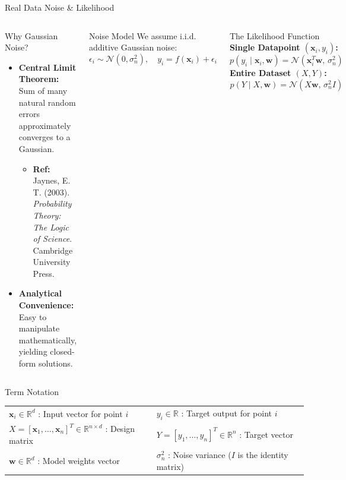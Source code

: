 \documentclass[aspectratio=169, 10pt,handout]{beamer}
\newcommand{\N}{\mathcal{N}}
\newcommand{\bw}{\mathbf{w}}
\newcommand{\bx}{\mathbf{x}}
\begin{document}
\begin{frame}{Real Data Noise \& Likelihood}

  \begin{columns}[T]
      \begin{block}{Why Gaussian Noise?}
        \scriptsize
        \begin{itemize}
          \item \textbf{Central Limit Theorem:} Sum of many natural random errors approximately converges to a Gaussian.
            \begin{itemize}
              \item \tiny \textbf{Ref:} Jaynes, E. T. (2003). \emph{Probability Theory: The Logic of Science}. Cambridge University Press.
            \end{itemize}
          \item \textbf{Analytical Convenience:} Easy to manipulate mathematically, yielding closed-form solutions.
        \end{itemize}
      \end{block}

      
      \begin{block}{Noise Model}
        \scriptsize
        We assume i.i.d. additive Gaussian noise:
        \[
          \epsilon_i \sim \N(0, \sigma_n^2), \quad y_i = f(\bx_i) + \epsilon_i
        \]
      \end{block}
      

      \begin{block}{The Likelihood Function}
        \scriptsize
        \textbf{Single Datapoint $(\bx_i, y_i)$:}
        \[
          p(y_i \mid \bx_i, \bw) = \N(\bx_i^T\bw, \, \sigma_n^2)
        \]
        \textbf{Entire Dataset $(X, Y)$:}
        \[
          p(Y \mid X, \bw) = \N(X\bw, \, \sigma_n^2 I)
        \]
      \end{block}
  \end{columns}

  \vspace{4pt}
  \begin{block}{Term Notation}
    \scriptsize
    \begin{tabular}{ll}
      $\bx_i \in \mathbb{R}^d$ : Input vector for point $i$ & 
      $y_i \in \mathbb{R}$ : Target output for point $i$ \\
      $X = [\bx_1, \dots, \bx_n]^T \in \mathbb{R}^{n \times d}$ : Design matrix & 
      $Y = [y_1, \dots, y_n]^T \in \mathbb{R}^n$ : Target vector \\
      $\bw \in \mathbb{R}^d$ : Model weights vector & 
      $\sigma_n^2$ : Noise variance ($I$ is the identity matrix)
    \end{tabular}
  \end{block}

\end{frame}
\end{document}
